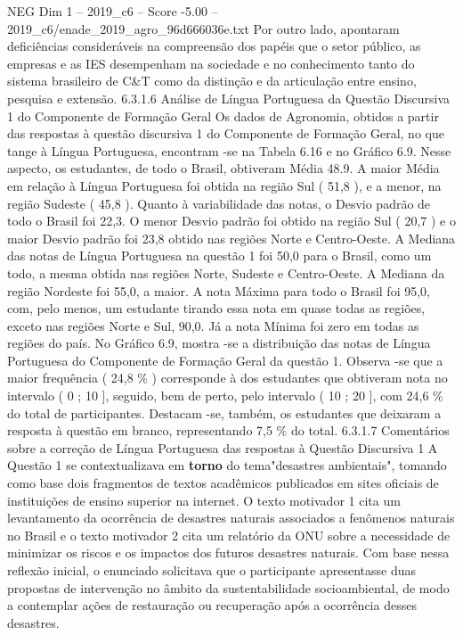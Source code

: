 \begin{textsample}{NEG Dim 1 – 2019\_c6 – Score -5.00 – 2019\_c6/enade\_2019\_agro\_96d666036e.txt}
Por outro lado, apontaram deficiências consideráveis na compreensão dos papéis que o setor público, as empresas e as IES desempenham na sociedade e no conhecimento tanto do sistema brasileiro de C\&T como da distinção e da articulação entre ensino, pesquisa e extensão. 6.3.1.6 Análise de Língua Portuguesa da Questão Discursiva 1 do Componente de Formação Geral Os dados de Agronomia, obtidos a partir das respostas à questão discursiva 1 do Componente de Formação Geral, no que tange à Língua Portuguesa, encontram -se na Tabela 6.16 e no Gráfico 6.9.
Nesse aspecto, os estudantes, de todo o Brasil, obtiveram Média 48.9.
A maior Média em relação à Língua Portuguesa foi obtida na região Sul ( 51,8 ), e a menor, na região Sudeste ( 45,8 ).
Quanto à variabilidade das notas, o Desvio padrão de todo o Brasil foi 22,3.
O menor Desvio padrão foi obtido na região Sul ( 20,7 ) e o maior Desvio padrão foi 23,8 obtido nas regiões Norte e Centro-Oeste.
A Mediana das notas de Língua Portuguesa na questão 1 foi 50,0 para o Brasil, como um todo, a mesma obtida nas regiões Norte, Sudeste e Centro-Oeste.
A Mediana da região Nordeste foi 55,0, a maior.
A nota Máxima para todo o Brasil foi 95,0, com, pelo menos, um estudante tirando essa nota em quase todas as regiões, exceto nas regiões Norte e Sul, 90,0.
Já a nota Mínima foi zero em todas as regiões do país.
No Gráfico 6.9, mostra -se a distribuição das notas de Língua Portuguesa do Componente de Formação Geral da questão 1.
Observa -se que a maior frequência ( 24,8 \% ) corresponde à dos estudantes que obtiveram nota no intervalo ( 0 ; 10 ], seguido, bem de perto, pelo intervalo ( 10 ; 20 ], com 24,6 \% do total de participantes.
Destacam -se, também, os estudantes que deixaram a resposta à questão em branco, representando 7,5 \% do total. 6.3.1.7 Comentários sobre a correção de Língua Portuguesa das respostas à Questão Discursiva 1 A Questão 1 se contextualizava em \textbf{torno} do tema"desastres ambientais", tomando como base dois fragmentos de textos acadêmicos publicados em sites oficiais de instituições de ensino superior na internet.
O texto motivador 1 cita um levantamento da ocorrência de desastres naturais associados a fenômenos naturais no Brasil e o texto motivador 2 cita um relatório da ONU sobre a necessidade de minimizar os riscos e os impactos dos futuros desastres naturais.
Com base nessa reflexão inicial, o enunciado solicitava que o participante apresentasse duas propostas de intervenção no âmbito da sustentabilidade socioambiental, de modo a contemplar ações de restauração ou recuperação após a ocorrência desses desastres.

\end{textsample}
